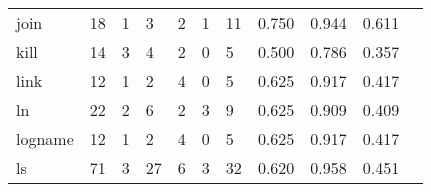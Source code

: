 \begin{longtable}{lp{1.2cm}p{1.2cm}p{1.2cm}p{1.2cm}p{1.2cm}p{1.2cm}p{1.2cm}p{1.2cm}p{1.2cm}p{1.2cm}}
join      &                                    18 &                                                  1 &                                                  3 &                                                  2 &                                                  1 &                                                 11 &                                         0.750 &                                              0.944 &                                              0.611 \\
kill      &                                    14 &                                                  3 &                                                  4 &                                                  2 &                                                  0 &                                                  5 &                                         0.500 &                                              0.786 &                                              0.357 \\
link      &                                    12 &                                                  1 &                                                  2 &                                                  4 &                                                  0 &                                                  5 &                                         0.625 &                                              0.917 &                                              0.417 \\
ln        &                                    22 &                                                  2 &                                                  6 &                                                  2 &                                                  3 &                                                  9 &                                         0.625 &                                              0.909 &                                              0.409 \\
logname   &                                    12 &                                                  1 &                                                  2 &                                                  4 &                                                  0 &                                                  5 &                                         0.625 &                                              0.917 &                                              0.417 \\
ls        &                                    71 &                                                  3 &                                                 27 &                                                  6 &                                                  3 &                                                 32 &                                         0.620 &                                              0.958 &                                              0.451 \\

\end{longtable}
